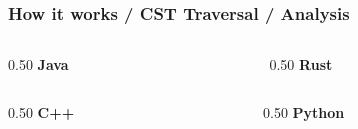 \documentclass[dvipsnames, 10pt, table]{beamer}
\begin{document}
\begin{frame}[fragile]
  \frametitle{How it works / CST Traversal / Analysis}
  \begin{columns}
    \begin{column}{0.50\textwidth}
      \center
      \textbf{Java}
      
    \end{column}
    \begin{column}{0.50\textwidth}
      \center
      \textbf{Rust}
      
    \end{column}
  \end{columns}
  \begin{columns}
    \begin{column}{0.50\textwidth}
      \center
      \textbf{C++}
      
    \end{column}
    \begin{column}{0.50\textwidth}
      \center
      \textbf{Python}
      
    \end{column}
  \end{columns}
\end{frame}
\end{document}

